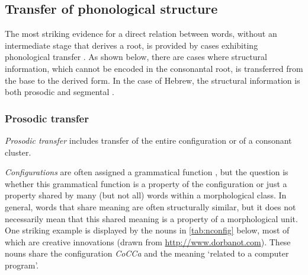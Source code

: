 \documentclass[output=paper,
modfonts
]{LSP/langsci}
\begin{document}
\subsection{Transfer of phonological structure}\label{transfer-of-phonological-structure}\label{sec:batel:3.1}

The most striking evidence for a direct relation between words, without
an intermediate stage that derives a root, is provided by cases
exhibiting phonological transfer \citep{clements1985a,hammond1988a,mccarthy1990a}. As shown below, there are cases where structural
information, which cannot be encoded in the consonantal root, is
transferred from the base to the derived form. In the case of Hebrew,
the structural information is both prosodic and segmental \citep{Batel1994}.

\subsubsection{Prosodic transfer}
\emph{Prosodic transfer} includes transfer of the entire configuration
or of a consonant cluster.

\emph{Configurations} are often assigned a grammatical function \citep{doron2003a}, but the question is whether this grammatical function is a
property of the configuration or just a property shared by many (but not
all) words within a morphological class. In general, words that share
meaning are often structurally similar, but it does not necessarily mean
that this shared meaning is a property of a morphological unit. One
striking example is displayed by the nouns in \cref{tab:nconfig} below, most of which
are creative innovations (drawn from
\url{http://www.dorbanot.com}). These nouns share the
configuration \emph{CoCCa} and the meaning `related to a computer
program'.

\end{document}
